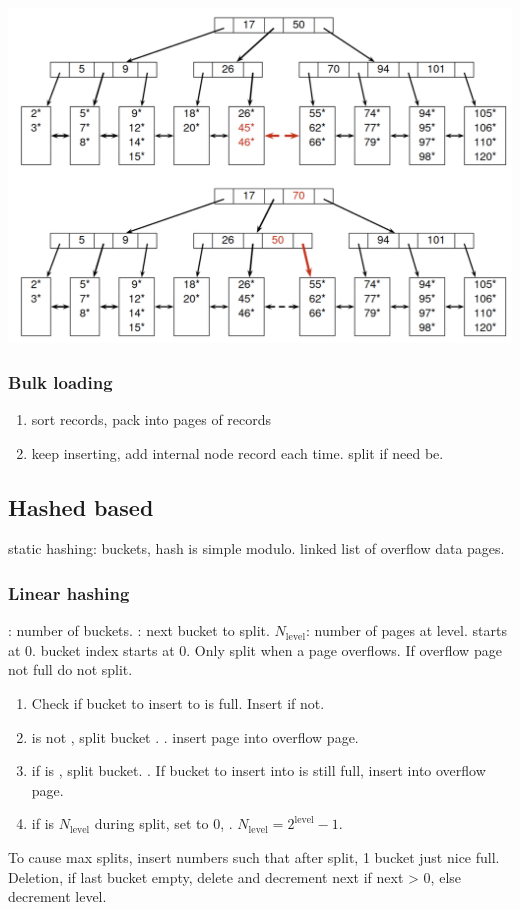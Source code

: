 \documentclass{article}
\begin{document}
\begin{multicols*}{4}
\includegraphics[width=\linewidth]{./res/bredist.png}

\subsubsection{Bulk loading}
\begin{enumerate}
  \item sort records, pack into pages of  records
  \item keep inserting, add internal node record each time. split if need be.
\end{enumerate}

\subsection{Hashed based}
static hashing:  buckets, hash is simple modulo. linked list of overflow data pages.

\subsubsection{Linear hashing}
: number of buckets. : next bucket to split. $N_\mathrm{level}$: number of pages at level. starts at 0. 
bucket index starts at 0. 
Only split when a page overflows. If overflow page not full do not split.
\begin{enumerate}
  \item Check if bucket  to insert to is full. Insert if not.
  \item {} is not , split bucket . . insert page into overflow page.
  \item if  is , split bucket. . If bucket to insert into is still full, insert into overflow page.
  \item if  is $N_\mathrm{level}$ during split, set  to 0, . $N_\mathrm{level} = 2^\mathrm{level} - 1$.
\end{enumerate}
To cause max splits, insert numbers such that after split, 1 bucket just nice full. Deletion, if last bucket empty, delete and decrement next if next > 0, else decrement level.


\end{multicols*}
\end{document}
